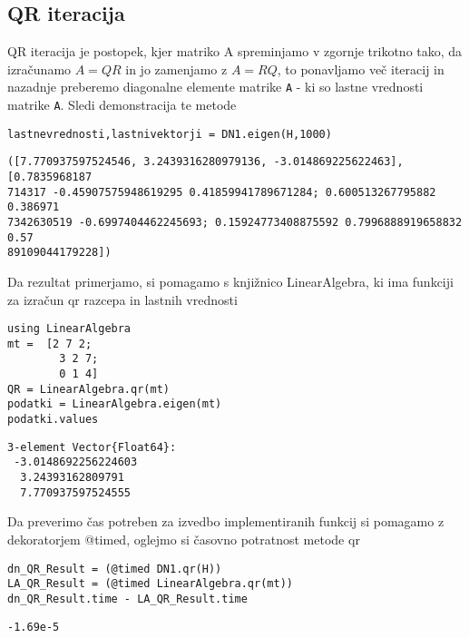 \documentclass[12pt,a4paper]{article}
\begin{document}
\subsection{QR iteracija}
QR iteracija je postopek, kjer matriko A spreminjamo v zgornje trikotno tako, da izračunamo $A = QR$ in jo zamenjamo z $A = RQ$, to ponavljamo več iteracij in nazadnje preberemo diagonalne elemente matrike \texttt{A} - ki so lastne vrednosti matrike \texttt{A}. Sledi demonstracija te metode


\begin{verbatim}
lastnevrednosti,lastnivektorji = DN1.eigen(H,1000)
\end{verbatim}
\begin{verbatim}
([7.770937597524546, 3.2439316280979136, -3.014869225622463], [0.7835968187
714317 -0.45907575948619295 0.41859941789671284; 0.600513267795882 0.386971
7342630519 -0.6997404462245693; 0.15924773408875592 0.7996888919658832 0.57
89109044179228])
\end{verbatim}

Da rezultat primerjamo, si pomagamo s knjižnico LinearAlgebra, ki ima funkciji za izračun qr razcepa in lastnih vrednosti


\begin{verbatim}
using LinearAlgebra
mt =  [2 7 2;
        3 2 7;
        0 1 4]
QR = LinearAlgebra.qr(mt)
podatki = LinearAlgebra.eigen(mt)
podatki.values
\end{verbatim}
\begin{verbatim}
3-element Vector{Float64}:
 -3.0148692256224603
  3.24393162809791
  7.770937597524555
\end{verbatim}

Da preverimo čas potreben za izvedbo implementiranih funkcij si pomagamo z dekoratorjem @timed, oglejmo si časovno potratnost metode qr


\begin{verbatim}
dn_QR_Result = (@timed DN1.qr(H))
LA_QR_Result = (@timed LinearAlgebra.qr(mt))
dn_QR_Result.time - LA_QR_Result.time
\end{verbatim}
\begin{verbatim}
-1.69e-5
\end{verbatim}
\end{document}
